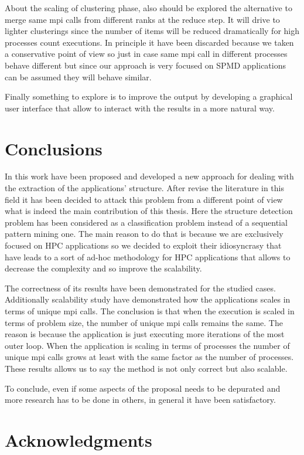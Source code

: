 About the scaling of clustering phase, also should be explored the alternative
to merge same mpi calls from different ranks at the reduce step. It will drive
to lighter clusterings since the number of items will be reduced dramatically
for high processes count executions. In principle it
have been discarded because we taken a conservative point of view so 
just in case same mpi call in different processes behave different but
since our approach is very focused on SPMD applications can be assumed they will
behave similar.

Finally something to explore is to improve the output by developing a graphical
user interface that allow to interact with the results in a more natural way.

\section{Conclusions}

In this work have been proposed and developed a new approach for dealing with
the extraction of the applications' structure. After revise the literature in
this field it has been decided to attack this problem from a different point of
view what is indeed the main contribution of this thesis. Here the structure 
detection problem has been considered as a classification problem instead of 
a sequential pattern mining one. The main reason to do that is because we are 
exclusively
focused on HPC applications so we decided to exploit their 
idiosyncrasy that have leads to a sort of ad-hoc methodology for HPC applications 
that allows to decrease the complexity and so improve the scalability.  

The correctness of its results have been demonstrated for the studied cases.
Additionally scalability study have demonstrated how the applications scales in
terms of unique mpi calls. The conclusion is that when the execution is scaled
in terms of problem size, the number of unique mpi calls remains the same. The
reason is because the application is just executing more iterations of the most
outer loop. When the application is scaling in terms of processes the number of
unique mpi calls grows at least with the same factor as the number of processes.
These results allows us to say the method is not only correct but also scalable.

To conclude, even if some aspects of the proposal needs to be depurated and more
research has to be done in others, in general it have been satisfactory.

\section{Acknowledgments}


